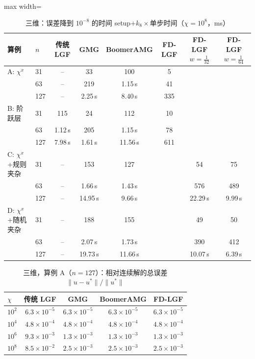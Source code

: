\begin{table}[H]\centering\small
\caption{三维：误差降到 $10^{-8}$ 的时间 setup$+k_8\times$单步时间（$\chi=10^8$，ms）}\label{tab:t83d}
\begin{adjustbox}{max width=\textwidth}
\begin{tabular}{llcccccc}
\toprule
算例 & $n$ & 传统 LGF & GMG & BoomerAMG & FD-LGF & FD-LGF $w{=}\frac1{32}$ & FD-LGF $w{=}\frac1{64}$ \\
\midrule
A: $\chi^x$ & 31 & -- & 33 & 100 & 5 &  &  \\
 & 63 & -- & 219 & 1.15\,s & 41 &  &  \\
 & 127 & -- & 2.25\,s & 8.40\,s & 335 &  &  \\
\midrule
B: 阶跃层 & 31 & 115 & 24 & 112 & 10 &  &  \\
 & 63 & 1.12\,s & 205 & 1.15\,s & 78 &  &  \\
 & 127 & 7.98\,s & 1.61\,s & 11.56\,s & 611 &  &  \\
\midrule
C: $\chi^x$+规则夹杂 & 31 & -- & 153 & 127 &  & 54 & 75 \\
 & 63 & -- & 1.66\,s & 1.43\,s &  & 576 & 489 \\
 & 127 & -- & 14.95\,s & 9.66\,s &  & 22.29\,s & 9.99\,s \\
\midrule
D: $\chi^x$+随机夹杂 & 31 & -- & 188 & 155 &  & 49 & 50 \\
 & 63 & -- & 2.07\,s & 1.73\,s &  & 390 & 412 \\
 & 127 & -- & 19.73\,s & 11.66\,s &  & 10.07\,s & 6.39\,s \\
\bottomrule
\end{tabular}
\end{adjustbox}
\end{table}

\begin{table}[H]\centering\small
\caption{三维，算例 A（$n=127$）：相对连续解的总误差 $\|u-u^*\|/\|u^*\|$}\label{tab:aerr三维}
\begin{tabular}{lcccc}
\toprule
$\chi$ & 传统 LGF & GMG & BoomerAMG & FD-LGF \\
\midrule
$10^{2}$ & $6.3{\times}10^{-5}$ & $6.3{\times}10^{-5}$ & $6.3{\times}10^{-5}$ & $6.3{\times}10^{-5}$ \\
$10^{4}$ & $4.8{\times}10^{-4}$ & $4.8{\times}10^{-4}$ & $4.8{\times}10^{-4}$ & $4.8{\times}10^{-4}$ \\
$10^{6}$ & $9.3{\times}10^{-3}$ & $1.3{\times}10^{-3}$ & $1.3{\times}10^{-3}$ & $1.3{\times}10^{-3}$ \\
$10^{8}$ & $8.5{\times}10^{-2}$ & $2.5{\times}10^{-3}$ & $2.5{\times}10^{-3}$ & $2.5{\times}10^{-3}$ \\
\bottomrule
\end{tabular}
\end{table}
